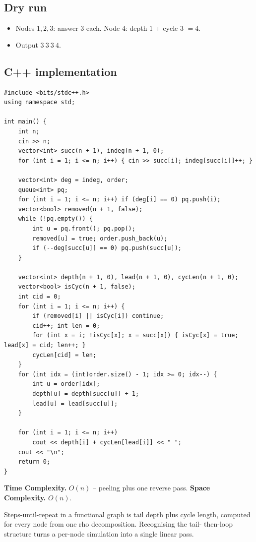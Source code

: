 \subsection*{Dry run}


\begin{itemize}
  \item Nodes $1,2,3$: answer $3$ each. Node $4$: depth $1$ + cycle $3$
        $=4$.
  \item Output $3\ 3\ 3\ 4$.
\end{itemize}

\subsection*{C++ implementation}

\begin{lstlisting}
#include <bits/stdc++.h>
using namespace std;

int main() {
    int n;
    cin >> n;
    vector<int> succ(n + 1), indeg(n + 1, 0);
    for (int i = 1; i <= n; i++) { cin >> succ[i]; indeg[succ[i]]++; }

    vector<int> deg = indeg, order;
    queue<int> pq;
    for (int i = 1; i <= n; i++) if (deg[i] == 0) pq.push(i);
    vector<bool> removed(n + 1, false);
    while (!pq.empty()) {
        int u = pq.front(); pq.pop();
        removed[u] = true; order.push_back(u);
        if (--deg[succ[u]] == 0) pq.push(succ[u]);
    }

    vector<int> depth(n + 1, 0), lead(n + 1, 0), cycLen(n + 1, 0);
    vector<bool> isCyc(n + 1, false);
    int cid = 0;
    for (int i = 1; i <= n; i++) {
        if (removed[i] || isCyc[i]) continue;
        cid++; int len = 0;
        for (int x = i; !isCyc[x]; x = succ[x]) { isCyc[x] = true; lead[x] = cid; len++; }
        cycLen[cid] = len;
    }
    for (int idx = (int)order.size() - 1; idx >= 0; idx--) {
        int u = order[idx];
        depth[u] = depth[succ[u]] + 1;
        lead[u] = lead[succ[u]];
    }

    for (int i = 1; i <= n; i++)
        cout << depth[i] + cycLen[lead[i]] << " ";
    cout << "\n";
    return 0;
}
\end{lstlisting}

\begin{complexitybox}
\textbf{Time Complexity.} $O(n)$ -- peeling plus one reverse pass.
\textbf{Space Complexity.} $O(n)$.
\end{complexitybox}

\begin{takeawaybox}
Steps-until-repeat in a functional graph is tail depth plus cycle length,
computed for every node from one rho decomposition. Recognising the tail-
then-loop structure turns a per-node simulation into a single linear pass.
\end{takeawaybox}
